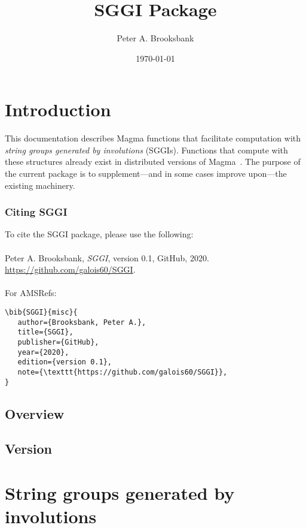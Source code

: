 \documentclass{documentation}
\title{SGGI Package}
\author{Peter A. Brooksbank}
\date{\today}
\begin{document}
\frontmatter

\dominitoc
\maketitle
\tableofcontents

\mainmatter

\chapter{Introduction}

This documentation describes {\sc Magma} functions that facilitate computation with {\em string groups generated by involutions} (SGGIs). 
Functions that compute with these structures already exist in distributed versions of {\sc Magma}~\cite{Magma}. The purpose of the 
current package is to supplement---and in some cases improve upon---the existing machinery.

\subsection*{Citing SGGI} 
To cite the SGGI package, please use the following:\\
\\
Peter A. Brooksbank, \emph{SGGI}, version 0.1, GitHub, 2020. \url{https://github.com/galois60/SGGI}. \\
\\
For AMSRefs:
\begin{verbatim}
\bib{SGGI}{misc}{
   author={Brooksbank, Peter A.},
   title={SGGI},
   publisher={GitHub},
   year={2020},
   edition={version 0.1},
   note={\texttt{https://github.com/galois60/SGGI}},
}
\end{verbatim}

\section{Overview}

\section{Version}

\chapter{String groups generated by involutions}
\end{document}
